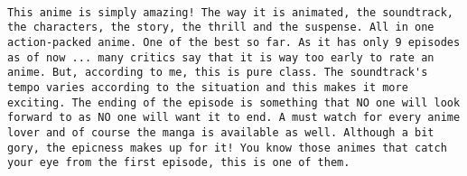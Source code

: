 \documentclass[
]{article}
\begin{document}
\begin{verbatim}
                                                                                                                                                                                                                                                                                                                                                                                                                                                                                                                                                                                                                                                                                                                                                                                                                                                                                                                                                                                                                                                                                                                                                                                                                                                                                                                                                                                                                                                                                                                                                                                                                                                                                                                                                                                                                                                                                                                                                                                                                                                                                                                                                                                                                                                                                                                                                                                                                                                                                                This anime is simply amazing! The way it is animated, the soundtrack, the characters, the story, the thrill and the suspense. All in one action-packed anime. One of the best so far. As it has only 9 episodes as of now ... many critics say that it is way too early to rate an anime. But, according to me, this is pure class. The soundtrack's tempo varies according to the situation and this makes it more exciting. The ending of the episode is something that NO one will look forward to as NO one will want it to end. A must watch for every anime lover and of course the manga is available as well. Although a bit gory, the epicness makes up for it! You know those animes that catch your eye from the first episode, this is one of them.

\end{verbatim}
\end{document}
